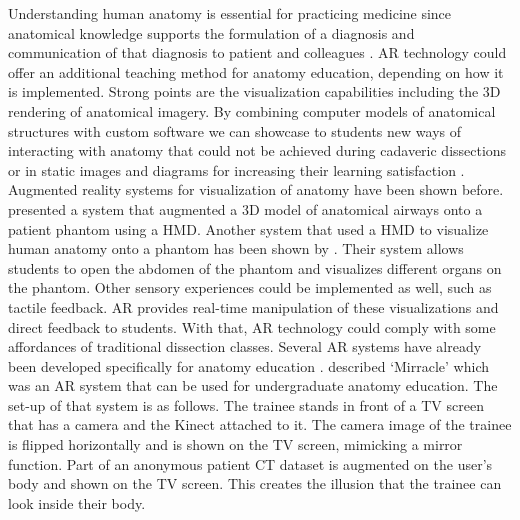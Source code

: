 Understanding human anatomy is essential for practicing medicine since anatomical knowledge supports the formulation of a diagnosis and communication of that diagnosis to patient and colleagues \cite{Frank2005}.  AR technology could offer an additional teaching method for anatomy education, depending on how it is implemented. Strong points are the visualization capabilities including the 3D rendering of anatomical imagery.
By combining computer models of anatomical structures with custom software we can showcase to students new ways of interacting with anatomy that could not be achieved during cadaveric dissections or in static images and diagrams for increasing their learning satisfaction \cite{Bacca2014,ma2013ismar,NMC2014}.
Augmented reality systems for visualization of anatomy have been shown before. \cite{Davis2002} presented a system that augmented a 3D model of anatomical airways onto a patient phantom using a HMD. Another system that used a HMD to visualize human anatomy onto a phantom has been shown by \cite{Juan2008a}. Their system allows students to open the abdomen of the phantom and visualizes different organs on the phantom.
Other sensory experiences could be implemented as well, such as tactile feedback. AR provides real-time manipulation of these visualizations and direct feedback to students. With that, AR technology could comply with some affordances of traditional dissection classes. Several AR systems have already been developed specifically for anatomy education \cite{Thomas2010,Chien2010,Blum2012b}. 
\citet{Blum2012b} described `Mirracle' which was an AR system that can be used for undergraduate anatomy education. The set-up of that system is as follows. The trainee stands in front of a TV screen that has a camera and the Kinect attached to it. The camera image of the trainee is flipped horizontally and is shown on the TV screen, mimicking a mirror function. Part of an anonymous patient CT dataset is augmented on the user's body and shown on the TV screen. This creates the illusion that the trainee can look inside their body. 

